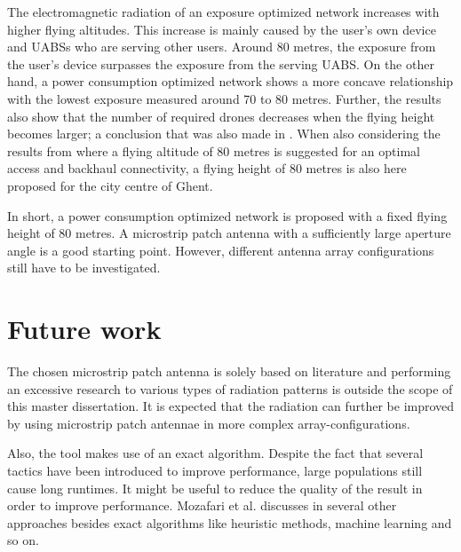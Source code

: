 The electromagnetic radiation of an exposure optimized network increases with higher flying altitudes. This increase is mainly caused by the user's 
own device and \gls{UABS}s who are serving other users. Around 80 metres, the exposure from the  user's device surpasses the exposure from the serving \gls{UABS}.
On the other hand, a power consumption optimized network shows a more concave relationship with the lowest exposure measured around 70 to 80 metres.
Further, the results also show that the number of required drones decreases when the flying height becomes larger; a conclusion that was also made in \cite{J2}.
 When also considering the results from \cite{U1} where a flying altitude of  
80 metres is suggested for an optimal access and backhaul connectivity, a flying height 
of 80 metres is also here proposed for the city centre of Ghent.

In short, a power consumption optimized network is proposed with a fixed flying height of 80 metres. A microstrip patch 
antenna with a sufficiently large aperture angle is a good starting point.  However, different antenna array configurations still have to 
be investigated.

\section{Future work}

The chosen microstrip patch antenna is solely based on literature and performing an excessive research to various 
types of radiation patterns is outside the scope of this master dissertation. It is expected that the radiation can 
further be improved by using microstrip patch antennae in more complex array-configurations.

Also, the tool makes use of an \gls{exact algorithm}. Despite the fact that several  
tactics have been introduced to improve performance, large populations still cause long runtimes. It might be useful 
to reduce the quality of the result in order to improve performance. Mozafari et al. discusses in \cite{U3} several 
other approaches besides \gls{exact algorithm}s like heuristic methods, machine learning and so on.